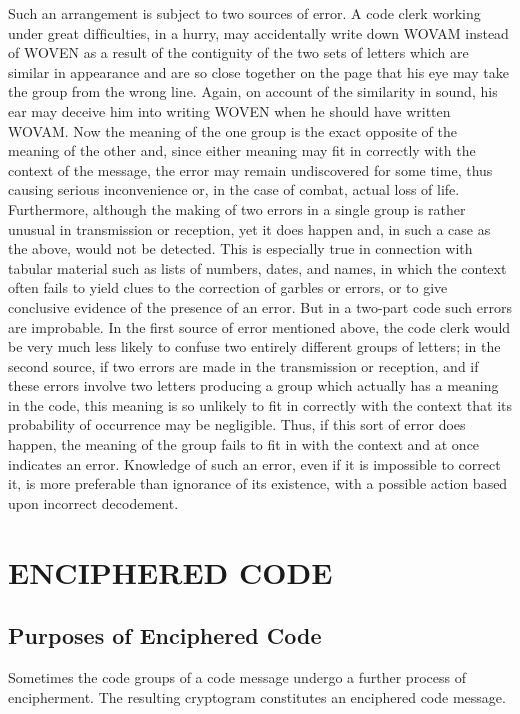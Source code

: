 Such an arrangement is subject to two sources of error. A code clerk
working under great difﬁculties, in a hurry, may accidentally write down
WOVAM instead of WOVEN as a result of the contiguity of the two
sets of letters which are similar in appearance and are so close together
on the page that his eye may take the group from the wrong line. Again,
on account of the similarity in sound, his ear may deceive him into
writing WOVEN when he should have written WOVAM. Now the
meaning of the one group is the exact opposite of the meaning of the
other and, since either meaning may ﬁt in correctly with the context of
the message, the error may remain undiscovered for some time, thus
causing serious inconvenience or, in the case of combat, actual loss of life.
Furthermore, although the making of two errors in a single group is
rather unusual in transmission or reception, yet it does happen and, in
such a case as the above, would not be detected. This is especially true
in connection with tabular material such as lists of numbers, dates, and
names, in which the context often fails to yield clues to the correction of
garbles or errors, or to give conclusive evidence of the presence of an
error. But in a two-part code such errors are improbable. In the ﬁrst
source of error mentioned above, the code clerk would be very much less
likely to confuse two entirely different groups of letters; in the second
source, if two errors are made in the transmission or reception, and if
these errors involve two letters producing a group which actually has a
meaning in the code, this meaning is so unlikely to ﬁt in correctly with
the context that its probability of occurrence may be negligible. Thus, if
this sort of error does happen, the meaning of the group fails to ﬁt in
with the context and at once indicates an error. Knowledge of such an
error, even if it is impossible to correct it, is more preferable than
ignorance of its existence, with a possible action based upon incorrect
decodement.

\section{ENCIPHERED CODE}

\subsection{Purposes of Enciphered Code}

\mypara Sometimes the code groups of a code message undergo a further
process of encipherment. The resulting cryptogram constitutes an
enciphered code message.

